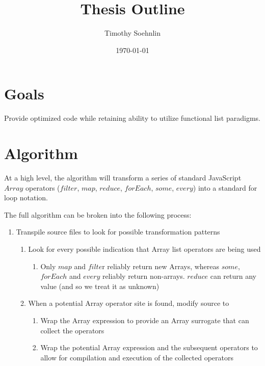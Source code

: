 \documentclass{article}
\title{Thesis Outline}
\author{Timothy Soehnlin}
\date{\today}
\begin{document}
\section{Goals}
Provide optimized code while retaining ability to utilize functional list paradigms.

\section{Algorithm}
At a high level, the algorithm will transform a series of standard JavaScript $Array$ operators ($filter$, $map$, 
$reduce$, $forEach$, $some$, $every$) into a standard for loop notation.  

The full algorithm can be broken into the following process:
\begin{enumerate}
  \item Transpile source files to look for possible transformation patterns
  \begin{enumerate}
    \item Look for every possible indication that Array list operators are being used
    \begin{enumerate}
      \item Only $map$ and $filte$r reliably return new Arrays, whereas $some$, 
        $forEach$ and $every$ reliably return non-arrays.  $reduce$ can return 
        any value (and so we treat it as unknown)    
    \end{enumerate}
    \item When a potential Array operator site is found, modify source to
    \begin{enumerate} 
      \item	Wrap the Array expression to provide an Array surrogate that can collect the operators
      \item	Wrap the potential Array expression and the subsequent operators to allow for compilation and execution of the collected operators
    \end{enumerate}    
  \end{enumerate}
\end{enumerate}
\end{document}
